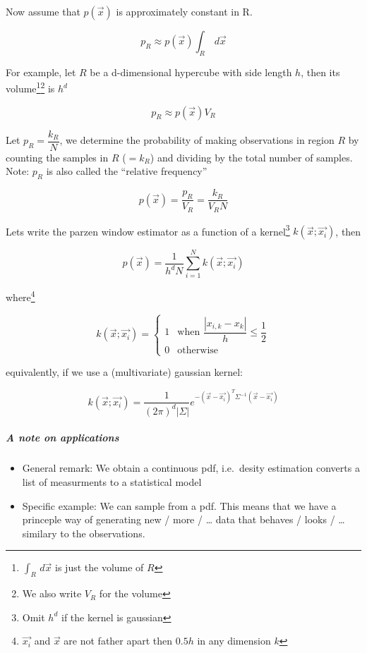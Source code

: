 Now assume that $p(\vec{x})$ is approximately constant in R.

\begin{equation*}
  p_R \approx p(\vec{x}) \int_R \,d\vec{x}
\end{equation*}

For example, let $R$ be a d-dimensional hypercube with side length $h$, then its volume\footnote{$\int_R \,d\vec{x}$ is just the volume of $R$}\footnote{We also write $V_R$ for the volume} is $h^d$

\begin{equation*}
  p_R \approx p(\vec{x}) V_R
\end{equation*}

Let $p_R = \dfrac{k_R}{N}$, we determine the probability of making observations in region $R$ by counting the samples in $R$ ($=k_R$) and dividing by the total number of samples. Note: $p_R$ is also called the ``relative frequency''

\begin{equation*}
  p(\vec{x}) = \dfrac{p_R}{V_R} = \dfrac{k_R}{V_R N}
\end{equation*}

Lets write the parzen window estimator as a function of a kernel\footnote{Omit $h^d$ if the kernel is gaussian} $k(\vec{x}; \vec{x_i})$, then

\begin{equation*}
  p(\vec{x}) = \dfrac{1}{h^d N} \sum_{i=1}^N k(\vec{x}; \vec{x_i})
\end{equation*}

where\footnote{$\vec{x_i}$ and $\vec{x}$ are not father apart then $0.5 h$ in any dimension $k$}

\begin{equation*}
  k(\vec{x}; \vec{x_i}) = \begin{cases}
    1 &\text{when } \dfrac{|x_{i,k} - x_k|}{h} \le \dfrac{1}{2}\\
    0 &\text{otherwise}
  \end{cases}
\end{equation*}

equivalently, if we use a (multivariate) gaussian kernel:


\begin{equation*}
   k(\vec{x}; \vec{x_i}) = \dfrac{1}{{(2\pi)}^d |\Sigma|} e^{-{(\vec{x} - \vec{x_i})}^T \Sigma^{-1}(\vec{x}-\vec{x_i})}
\end{equation*}

\subparagraph{A note on applications}
\begin{itemize}
  \item General remark: We obtain a continuous pdf, i.e.\ desity estimation converts a list of measurments to a statistical model
  \item Specific example: We can sample from a pdf. This means that we have a princeple way of generating new / more / \ldots{} data that behaves / looks / \ldots{} similary to the observations.
\end{itemize}


